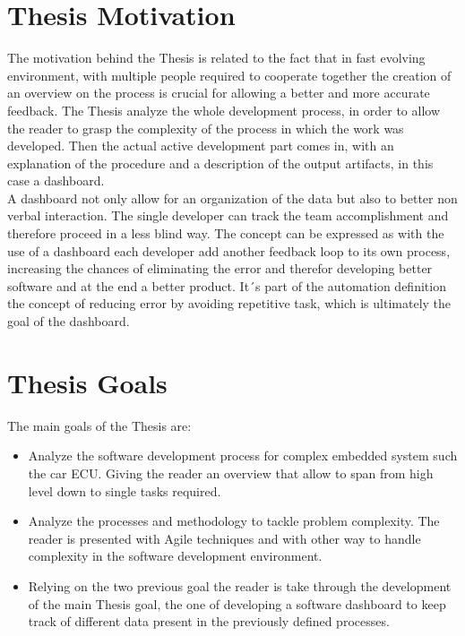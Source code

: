 \documentclass[../main.tex]{subfiles}
\begin{document}
\section{Thesis Motivation}
The motivation behind the Thesis is related to the fact that in fast evolving environment, with multiple people required to cooperate together the creation of an overview on the process is crucial for allowing a better and more accurate feedback. 
The Thesis analyze the whole development process, in order to allow the reader to grasp the complexity of the process in which the work was developed. Then the actual active development part comes in, with an explanation of the procedure and a description of the output artifacts, in this case a dashboard.\\
A dashboard not only allow for an organization of the data but also to better non verbal interaction. The single developer can track the team accomplishment and therefore proceed in a less blind way. The concept can be expressed as with the use of a dashboard each developer add another feedback loop to its own process, increasing the chances of eliminating the error and therefor developing better software and at the end a better product. It´s part of the automation definition the concept of reducing error by avoiding repetitive task, which is ultimately the goal of the dashboard. 
\section{Thesis Goals}
The main goals of the Thesis are:
\begin{itemize}
    \item Analyze the software development process for complex embedded system such the car ECU. Giving the reader an overview that allow to span from high level down to single tasks required. 
    \item Analyze the processes and methodology to tackle problem complexity. The reader is presented with Agile techniques and with other way to handle complexity in the software development environment.
    \item Relying on the two previous goal the reader is take through the development of the main Thesis goal, the one of developing a software dashboard to keep track of different data present in the previously defined processes.
\end{itemize}
\cleardoublepage
\end{document}
